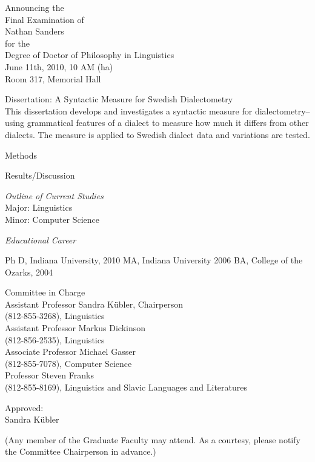 \documentclass[11pt]{article}
\begin{document}
\begin{center}
Announcing the\\
Final Examination of \\
Nathan Sanders \\
for the \\
Degree of Doctor of Philosophy in Linguistics \\
June 11th, 2010, 10 AM (ha) \\
Room 317, Memorial Hall
\end{center}

Dissertation: A Syntactic Measure for Swedish Dialectometry \\

This dissertation develops and investigates a syntactic measure for
dialectometry--using grammatical features of a dialect to measure how
much it differs from other dialects. The measure is applied to Swedish
dialect data and variations are tested.

Methods

Results/Discussion

\begin{minipage}[b]{0.5\linewidth}\centering
{\it Outline of Current Studies} \\

Major: Linguistics \\
Minor: Computer Science
\end{minipage}
\begin{minipage}[b]{0.5\linewidth}\centering
{\it Educational Career}

Ph D, Indiana University, 2010
MA, Indiana University 2006
BA, College of the Ozarks, 2004
\end{minipage}

\begin{center}
Committee in Charge \\
Assistant Professor Sandra K\"ubler, Chairperson \\
(812-855-3268), Linguistics \\
Assistant Professor Markus Dickinson \\
(812-856-2535), Linguistics \\
Associate Professor Michael Gasser \\
(812-855-7078), Computer Science \\
Professor Steven Franks \\
(812-855-8169), Linguistics and Slavic Languages and Literatures
\end{center}
\begin{center}
Approved: \hrulefill \\
Sandra K\"ubler
\end{center}

(Any member of the Graduate Faculty may attend. As a courtesy, please
notify the Committee Chairperson in advance.)
\end{document}
